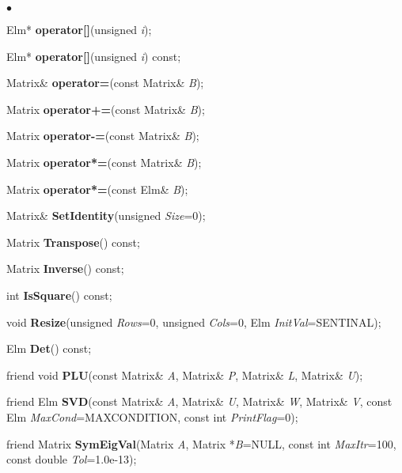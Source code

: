 \documentclass{article}
\newcommand{\Func}[1]{\textbf{#1}}
\newcommand{\var}[1]{\textit{#1}}
\newenvironment{LIST}{\begin{list}{$\bullet$}{%
      \setlength{\leftmargin}{2\leftmargin}%
      \setlength{\itemindent}{-1cm}}}%
  {\end{list}}
\begin{document}
\begin{LIST}
 \item Elm* \Func{operator[]}(unsigned \var{i});\\
 \item Elm* \Func{operator[]}(unsigned \var{i}) const;\\
  
  
 \item Matrix\& \Func{operator=}(const Matrix\& \var{B});\\
 \item Matrix \Func{operator+=}(const Matrix\& \var{B});\\
 \item Matrix \Func{operator-=}(const Matrix\& \var{B});\\
 \item Matrix \Func{operator*=}(const Matrix\& \var{B});\\
 \item Matrix \Func{operator*=}(const Elm\& \var{B});\\

 \item Matrix\& \Func{SetIdentity}(unsigned \var{Size}=0);\\
 \item Matrix \Func{Transpose}() const;\\
 \item Matrix \Func{Inverse}() const;\\
 \item int \Func{IsSquare}() const;\\

 \item void \Func{Resize}(unsigned \var{Rows}=0, unsigned \var{Cols}=0, Elm \var{InitVal}=SENTINAL);\\
 \item Elm \Func{Det}() const;

 \item friend void \Func{PLU}(const Matrix\& \var{A}, Matrix\& \var{P}, Matrix\& \var{L}, Matrix\& \var{U});\\

  \item friend Elm \Func{SVD}(const Matrix\& \var{A}, Matrix\& \var{U},
   Matrix\& \var{W}, Matrix\& \var{V}, const Elm \var{MaxCond}=MAXCONDITION,
   const int \var{PrintFlag}=0);\\

  \item friend Matrix \Func{SymEigVal}(Matrix \var{A}, Matrix *\var{B}=NULL,
   const int \var{MaxItr}=100, const double \var{Tol}=1.0e-13);\\


\end{LIST}
\end{document}
